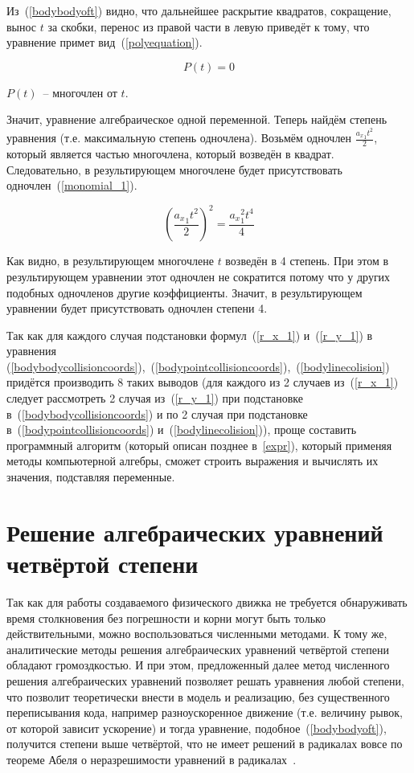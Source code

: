 Из~(\ref{bodybodyoft}) видно, что дальнейшее раскрытие квадратов, сокращение, вынос \(t\) за скобки,
перенос из правой части в левую приведёт к тому, что уравнение примет вид~(\ref{polyequation}).

\begin{equation}\label{polyequation}
  P(t) = 0
\end{equation}

\begin{Underequation}
  \(P(t)\)~-- многочлен от \(t\).
\end{Underequation}

Значит, уравнение алгебраическое одной переменной.
Теперь найдём степень уравнения (т.е. максимальную степень одночлена).
Возьмём одночлен \(\frac{{a_x}_1 t^2}{2}\), который является частью многочлена, который возведён в квадрат.
Следовательно, в результирующем многочлене будет присутствовать одночлен~(\ref{monomial_1}).

\begin{equation}\label{monomial_1}
  (\frac{{a_x}_1 t^2}{2})^2 = \frac{{a_x}_1^2 t^4}{4}
\end{equation}

Как видно, в результирующем многочлене \(t\) возведён в 4 степень.
При этом в результирующем уравнении этот одночлен не сократится
потому что у других подобных одночленов другие коэффициенты.
Значит, в результирующем уравнении будет присутствовать одночлен степени 4.

Так как для каждого случая подстановки формул~(\ref{r_x_1}) и~(\ref{r_y_1}) в уравнения
(\ref{bodybodycollisioncoords}),~(\ref{bodypointcollisioncoords}),~(\ref{bodylinecolision})
придётся производить 8 таких выводов
(для каждого из 2 случаев из~(\ref{r_x_1}) следует рассмотреть 2 случая из~(\ref{r_y_1}) при подстановке в~(\ref{bodybodycollisioncoords})
и по 2 случая при подстановке в~(\ref{bodypointcollisioncoords}) и~(\ref{bodylinecolision})),
проще составить программный алгоритм (который описан позднее в~\ref{expr}),
который применяя методы компьютерной алгебры, сможет строить выражения и вычислять их значения, подставляя переменные.

\section{Решение алгебраических уравнений четвёртой степени}\label{solvefourthdegree}

Так как для работы создаваемого физического движка не требуется обнаруживать время столкновения
без погрешности и корни могут быть только действительными, можно воспользоваться численными методами.
К тому же, аналитические методы решения алгебраических уравнений четвёртой степени обладают громоздкостью.
И при этом, предложенный далее метод численного решения алгебраических уравнений позволяет решать уравнения любой степени,
что позволит теоретически внести в модель и реализацию, без существенного переписывания кода, например разноускоренное движение
(т.е. величину рывок, от которой зависит ускорение) и тогда уравнение, подобное~(\ref{bodybodyoft}),
получится степени выше четвёртой, что не имеет решений в радикалах вовсе по теореме Абеля о неразрешимости уравнений в радикалах~\cite[с.~112]{alekseevabel}.

